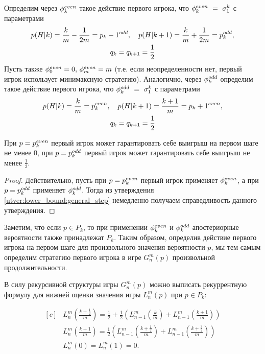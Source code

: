 Определим через $ \phi_k^{even} $ такое действие первого игрока, что $ \phi_k^{even}~=~\sigma^k_1 $ с параметрами
\begin{gather*}
  p(H|k) = \frac{k}{m} - \frac{1}{2m} = p_k-1^{odd}, \quad
  p(H|k+1) = \frac{k}{m} + \frac{1}{2m} = p_k^{odd},\\
  q_k = q_{k+1} = \frac{1}{2}
\end{gather*}
Пусть также $ \phi_0^{even} = 0,\, \phi_m^{even} = m $ (т.е. если неопределенности нет, первый игрок использует минимаксную стратегию).
Аналогично, через $ \phi_k^{odd} $ определим такое действие первого игрока, что $ \phi_k^{odd}~=~\sigma^k_1 $ с параметрами
\begin{gather*}
  p(H|k) = \frac{k}{m} = p_k^{even}, \quad
  p(H|k+1) = \frac{k + 1}{m} = p_k+1^{even}, \\
  q_k = q_{k+1} = \frac{1}{2}
\end{gather*}

\begin{utver}
\label{utver:first_player:strategy:extreme_points}
  При $ p = p_k^{even} $ первый игрок может гарантировать себе выигрыш на первом шаге не менее $ 0 $, при $ p = p_k^{odd} $ первый игрок может гарантировать себе выигрыш не менее $ \frac{1}{2} $.
\end{utver}
\begin{proof}
  Действительно, пусть при $ p = p_k^{even} $ первый игрок применяет $ \phi_k^{even} $, а при $ p = p_k^{odd} $ применяет $ \phi_k^{odd} $. Тогда из утверждения \ref{utver:lower_bound:general_step} немедленно получаем справедливость данного утверждения.
\end{proof}

Заметим, что если $ p \in P_k $, то при применении $ \phi_k^{even} $ и $ \phi_k^{odd} $ апостериорные вероятности также принадлежат $ P_k $.
Таким образом, определив действие первого игрока на первом шаге для произвольного значения вероятности $ p $, мы тем самым определим стратегию первого игрока в игре $ G_n^m(p) $ произвольной продолжительности.

В силу рекурсивной структуры игры $ G_n^m(p) $ можно выписать рекуррентную формулу для нижней оценки значения игры $ L_n^m(p) $ при $ p \in P_k $:

\begin{equation}
\label{eq:lower_bound:recurrence_finite}
\begin{aligned}[c]
&L_n^m\left(\frac{k+\frac{1}{2}}{m}\right) = 
    \frac{1}{2} + \frac{1}{2}\left(
        L_{n-1}^m\left(\frac{k}{m}\right) + 
        L_{n-1}^m\left(\frac{k + 1}{m}\right)
    \right) \\
&L_n^m\left(\frac{k+1}{m}\right) = 
    \frac{1}{2}\left(
        L_{n-1}^m\left(\frac{k+\frac{1}{2}}{m}\right) + 
        L_{n-1}^m\left(\frac{k+\frac{3}{2}}{m}\right)
    \right) \\
&L_n^m(0) = L_n^m(1) = 0.
\end{aligned}
\end{equation}

